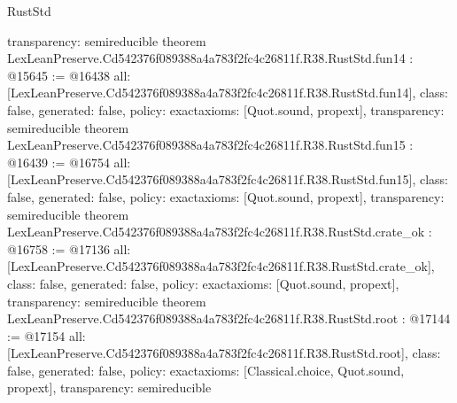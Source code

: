 \begin{lexlean}{RustStd}
\begin{coremodule}
{  transparency: semireducible
}
theorem LexLeanPreserve.Cd542376f089388a4a783f2fc4c26811f.R38.RustStd.fun14 : @15645 := @16438 {
  all: [LexLeanPreserve.Cd542376f089388a4a783f2fc4c26811f.R38.RustStd.fun14],
  class: false,
  generated: false,
  policy: exact{axioms: [Quot.sound, propext]},
  transparency: semireducible
}
theorem LexLeanPreserve.Cd542376f089388a4a783f2fc4c26811f.R38.RustStd.fun15 : @16439 := @16754 {
  all: [LexLeanPreserve.Cd542376f089388a4a783f2fc4c26811f.R38.RustStd.fun15],
  class: false,
  generated: false,
  policy: exact{axioms: [Quot.sound, propext]},
  transparency: semireducible
}
theorem LexLeanPreserve.Cd542376f089388a4a783f2fc4c26811f.R38.RustStd.crate_ok : @16758 := @17136 {
  all: [LexLeanPreserve.Cd542376f089388a4a783f2fc4c26811f.R38.RustStd.crate_ok],
  class: false,
  generated: false,
  policy: exact{axioms: [Quot.sound, propext]},
  transparency: semireducible
}
theorem LexLeanPreserve.Cd542376f089388a4a783f2fc4c26811f.R38.RustStd.root : @17144 := @17154 {
  all: [LexLeanPreserve.Cd542376f089388a4a783f2fc4c26811f.R38.RustStd.root],
  class: false,
  generated: false,
  policy: exact{axioms: [Classical.choice, Quot.sound, propext]},
  transparency: semireducible
}


\end{coremodule}
\end{lexlean}
